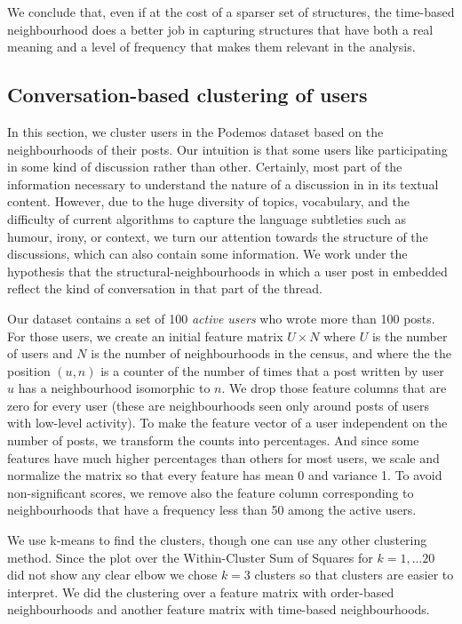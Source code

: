 \documentclass[conference]{IEEEtran}
\begin{document}
We conclude that, even if at the cost of a sparser set of structures, the time-based neighbourhood does a better job in capturing structures that have both a real meaning and a level of frequency that makes them relevant in the analysis.

\subsection{Conversation-based clustering of users}
In this section, we cluster users in the Podemos dataset based on the neighbourhoods of their posts. Our intuition is that some users like participating in some kind of discussion rather than other. Certainly, most part of the information necessary to understand the nature of a discussion in in its textual content. However, due to the huge diversity of topics, vocabulary, and the difficulty of current algorithms to capture the language subtleties such as humour, irony, or context, we turn our attention towards the structure of the discussions, which can also contain some information. We work under the  hypothesis that the structural-neighbourhoods in which a user post in embedded reflect the kind of conversation in that part of the thread. 

Our dataset contains a set of 100 \textit{active users} who wrote more than 100 posts. For those users, we create an initial feature matrix $U\times N$ where $U$ is the number of users and $N$ is the number of neighbourhoods in the census, and where the the position $(u,n)$ is a counter of the number of times that a post written by user $u$ has a neighbourhood isomorphic to $n$. We drop those feature columns that are zero for every user (these are neighbourhoods seen only around posts of users with low-level activity). To make the feature vector of a user independent on the number of posts, we transform the counts into percentages. And since some features have much higher percentages than others for most users, we scale and normalize the matrix so that every feature has mean 0 and variance 1. To avoid non-significant scores, we remove also the feature column corresponding to neighbourhoods that have a frequency less than 50 among the active users.

We use k-means to find the clusters, though one can use any other clustering method. Since the plot over the Within-Cluster Sum of Squares for $k=1,...20$ did not show any clear elbow we chose $k=3$ clusters so that clusters are easier to interpret. We did the clustering over a feature matrix with order-based neighbourhoods and another feature matrix with time-based neighbourhoods.
\end{document}
